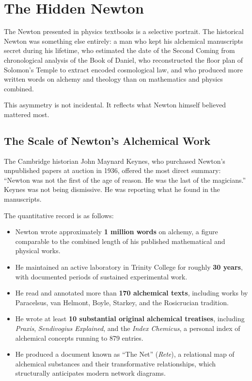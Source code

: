 \documentclass[12pt]{article}
\providecommand{\tightlist}{%
  \setlength{\itemsep}{0pt}\setlength{\parskip}{0pt}}
\begin{document}
\section{The Hidden Newton}\label{the-hidden-newton}

The Newton presented in physics textbooks is a selective portrait. The
historical Newton was something else entirely: a man who kept his
alchemical manuscripts secret during his lifetime, who estimated the
date of the Second Coming from chronological analysis of the Book of
Daniel, who reconstructed the floor plan of Solomon's Temple to extract
encoded cosmological law, and who produced more written words on alchemy
and theology than on mathematics and physics combined.

This asymmetry is not incidental. It reflects what Newton himself
believed mattered most.

\subsection{The Scale of Newton's Alchemical Work}\label{the-scale-of-newtons-alchemical-work}

The Cambridge historian John Maynard Keynes, who purchased Newton's
unpublished papers at auction in 1936, offered the most direct summary:
``Newton was not the first of the age of reason. He was the last of the
magicians.'' Keynes was not being dismissive. He was reporting what he
found in the manuscripts.

The quantitative record is as follows:

\begin{itemize}
\tightlist
\item
  Newton wrote approximately \textbf{1 million words} on alchemy, a
  figure comparable to the combined length of his published mathematical
  and physical works.
\item
  He maintained an active laboratory in Trinity College for roughly
  \textbf{30 years}, with documented periods of sustained experimental
  work.
\item
  He read and annotated more than \textbf{170 alchemical texts},
  including works by Paracelsus, van Helmont, Boyle, Starkey, and the
  Rosicrucian tradition.
\item
  He wrote at least \textbf{10 substantial original alchemical
  treatises}, including \emph{Praxis}, \emph{Sendivogius Explained}, and
  the \emph{Index Chemicus}, a personal index of alchemical concepts
  running to 879 entries.
\item
  He produced a document known as ``The Net'' (\emph{Rete}), a
  relational map of alchemical substances and their transformative
  relationships, which structurally anticipates modern network diagrams.
\end{itemize}
\end{document}
